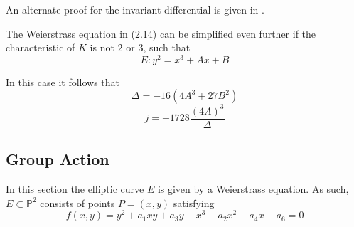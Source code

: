 An alternate proof for the invariant differential is given in \cite[page 76]{EllipticCurvesBook}.

The Weierstrass equation in (2.14) can be simplified even further if the characteristic of $K$ is not $2$ or $3$, such that
\begin{equation*}
E:y^2=x^3+Ax+B
\end{equation*}

In this case it follows that
\begin{equation*}
\Delta=-16(4A^3+27B^2)
\end{equation*}
\begin{equation*}
j=-1728\frac{(4A)^3}{\Delta}
\end{equation*}

\subsection{Group Action}
In this section the elliptic curve $E$ is given by a Weierstrass equation. As such, $E\subset\mathbb{P}^2$ consists of points $P=(x,y)$ satisfying
\begin{equation*}
f(x,y)=y^2+a_1xy+a_3y-x^3-a_2x^2-a_4x-a_6=0
\end{equation*}

